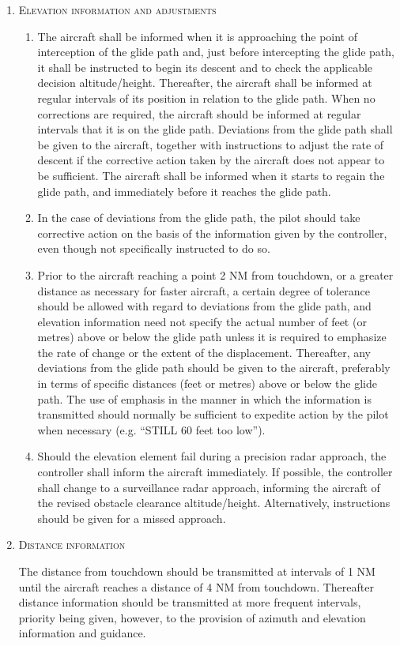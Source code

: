 \begin{enumeratesc}
\begin{enumerate}[labelindent=0pt,itemsep=0.2cm]
        \item \textsc{Elevation information and adjustments}
        \begin{enumerate}
            \item The aircraft shall be informed when it is approaching the point of interception of the glide path and, just before intercepting the glide path, it shall be instructed to begin its descent and to check the applicable decision altitude/height. Thereafter, the aircraft shall be informed at regular intervals of its position in relation to the glide path. When no corrections are required, the aircraft should be informed at regular intervals that it is on the glide path. Deviations from the glide path shall be given to the aircraft, together with instructions to adjust the rate of descent if the corrective action taken by the aircraft does not appear to be sufficient. The aircraft shall be informed when it starts to regain the glide path, and immediately before it reaches the glide path.
            \item In the case of deviations from the glide path, the pilot should take corrective action on the basis of the information given by the controller, even though not specifically instructed to do so.
            \item Prior to the aircraft reaching a point 2 NM from touchdown, or a greater distance as necessary for faster aircraft, a certain degree of tolerance should be allowed with regard to deviations from the glide path, and elevation information need not specify the actual number of feet (or metres) above or below the glide path unless it is required to emphasize the rate of change or the extent of the displacement. Thereafter, any deviations from the glide path should be given to the aircraft, preferably in terms of specific distances (feet or metres) above or below the glide path. The use of emphasis in the manner in which the information is transmitted should normally be sufficient to expedite action by the pilot when necessary (e.g. “STILL 60 feet too low”).
            \item Should the elevation element fail during a precision radar approach, the controller shall inform the aircraft immediately. If possible, the controller shall change to a surveillance radar approach, informing the aircraft of the revised obstacle clearance altitude/height. Alternatively, instructions should be given for a missed approach.
        \end{enumerate}

        \item \textsc{Distance information}
        \par\noindent The distance from touchdown should be transmitted at intervals of 1 NM until the aircraft reaches a distance of 4 NM from touchdown. Thereafter distance information should be transmitted at more frequent intervals, priority being given, however, to the provision of azimuth and elevation information and guidance.


\end{enumerate}
\end{enumeratesc}
